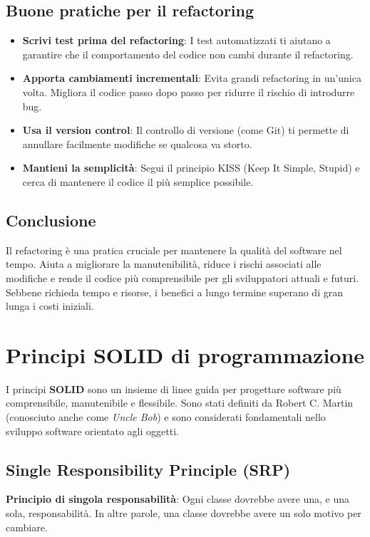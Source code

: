 \documentclass{article}
\begin{document}
\subsection{Buone pratiche per il refactoring}
\begin{itemize}
    \item \textbf{Scrivi test prima del refactoring}: I test automatizzati ti aiutano a garantire che il comportamento del codice non cambi durante il refactoring.
    \item \textbf{Apporta cambiamenti incrementali}: Evita grandi refactoring in un'unica volta. Migliora il codice passo dopo passo per ridurre il rischio di introdurre bug.
    \item \textbf{Usa il version control}: Il controllo di versione (come Git) ti permette di annullare facilmente modifiche se qualcosa va storto.
    \item \textbf{Mantieni la semplicità}: Segui il principio KISS (Keep It Simple, Stupid) e cerca di mantenere il codice il più semplice possibile.
\end{itemize}

\subsection{Conclusione}
Il refactoring è una pratica cruciale per mantenere la qualità del software nel tempo. Aiuta a migliorare la manutenibilità, riduce i rischi associati alle modifiche e rende il codice più comprensibile per gli sviluppatori attuali e futuri. Sebbene richieda tempo e risorse, i benefici a lungo termine superano di gran lunga i costi iniziali.




\section{Principi SOLID di programmazione}

I principi \textbf{SOLID} sono un insieme di linee guida per progettare software più comprensibile, manutenibile e flessibile. Sono stati definiti da Robert C. Martin (conosciuto anche come \textit{Uncle Bob}) e sono considerati fondamentali nello sviluppo software orientato agli oggetti.

\subsection{Single Responsibility Principle (SRP)}
\textbf{Principio di singola responsabilità}: Ogni classe dovrebbe avere una, e una sola, responsabilità. In altre parole, una classe dovrebbe avere un solo motivo per cambiare.
\end{document}
